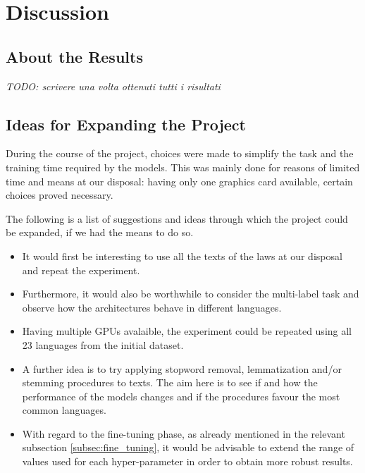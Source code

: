 \documentclass[letterpaper,11pt]{article}
\begin{document}
\newpage
\pagecolor{white}
\section{Discussion}

\subsection{About the Results}

\textit{TODO: scrivere una volta ottenuti tutti i risultati}

\subsection{Ideas for Expanding the Project}

During the course of the project, choices were made to simplify the task and the training time required by the models. This was mainly done for reasons of limited time and means at our disposal: having only one graphics card available, certain choices proved necessary.

The following is a list of suggestions and ideas through which the project could be expanded, if we had the means to do so.

\begin{itemize}
  \item It would first be interesting to use all the texts of the laws at our disposal and repeat the experiment.
  \item Furthermore, it would also be worthwhile to consider the multi-label task and observe how the architectures behave in different languages.
  \item Having multiple GPUs avalaible, the experiment could be repeated using all 23 languages from the initial dataset.
  \item A further idea is to try applying stopword removal, lemmatization and/or stemming procedures to texts. The aim here is to see if and how the performance of the models changes and if the procedures favour the most common languages.
  \item With regard to the fine-tuning phase, as already mentioned in the relevant subsection \ref{subsec:fine_tuning}, it would be advisable to extend the range of values used for each hyper-parameter in order to obtain more robust results. 
\end{itemize}



\newpage



\end{document}
